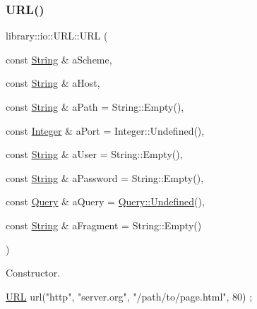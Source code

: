 \subsubsection{\texorpdfstring{U\+R\+L()}{URL()}\hspace{0.1cm}{\footnotesize\ttfamily [2/2]}}
{\footnotesize\ttfamily library\+::io\+::\+U\+R\+L\+::\+U\+RL (\begin{DoxyParamCaption}\item[{const \hyperlink{namespacelibrary_1_1io_a7469b45835a4421045db344d6a5a1f85}{String} \&}]{a\+Scheme,  }\item[{const \hyperlink{namespacelibrary_1_1io_a7469b45835a4421045db344d6a5a1f85}{String} \&}]{a\+Host,  }\item[{const \hyperlink{namespacelibrary_1_1io_a7469b45835a4421045db344d6a5a1f85}{String} \&}]{a\+Path = {\ttfamily String\+:\+:Empty()},  }\item[{const \hyperlink{namespacelibrary_1_1io_a0a929bf9e177597c2e92073d200dda53}{Integer} \&}]{a\+Port = {\ttfamily Integer\+:\+:Undefined()},  }\item[{const \hyperlink{namespacelibrary_1_1io_a7469b45835a4421045db344d6a5a1f85}{String} \&}]{a\+User = {\ttfamily String\+:\+:Empty()},  }\item[{const \hyperlink{namespacelibrary_1_1io_a7469b45835a4421045db344d6a5a1f85}{String} \&}]{a\+Password = {\ttfamily String\+:\+:Empty()},  }\item[{const \hyperlink{namespacelibrary_1_1io_a39ebaf2265de78ba79eb5347f2af61b3}{Query} \&}]{a\+Query = {\ttfamily \hyperlink{classlibrary_1_1io_1_1url_1_1_query_acea48a0bfba96773f6db11d1a904a520}{Query\+::\+Undefined}()},  }\item[{const \hyperlink{namespacelibrary_1_1io_a7469b45835a4421045db344d6a5a1f85}{String} \&}]{a\+Fragment = {\ttfamily String\+:\+:Empty()} }\end{DoxyParamCaption})}



Constructor. 


\begin{DoxyCode}
\hyperlink{classlibrary_1_1io_1_1_u_r_l_a7e9c070138a6dbd000ffb10b7cd8a5c4}{URL} url(\textcolor{stringliteral}{"http"}, \textcolor{stringliteral}{"server.org"}, \textcolor{stringliteral}{"/path/to/page.html"}, 80) ;
\end{DoxyCode}



